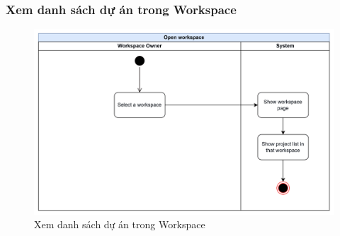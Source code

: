 \subsubsection{Xem danh sách dự án trong Workspace}
    \begin{figure}[H]
        \centering
        \includegraphics[width=\linewidth]{Content/Phân tích và thiết kế hệ thống/documents/Sơ đồ hoạt động/images/openWorkspace.png}
        \vspace{0.5cm}
        \caption{Xem danh sách dự án trong Workspace}
        \label{fig:Xem danh sách dự án trong Workspace}
    \end{figure}